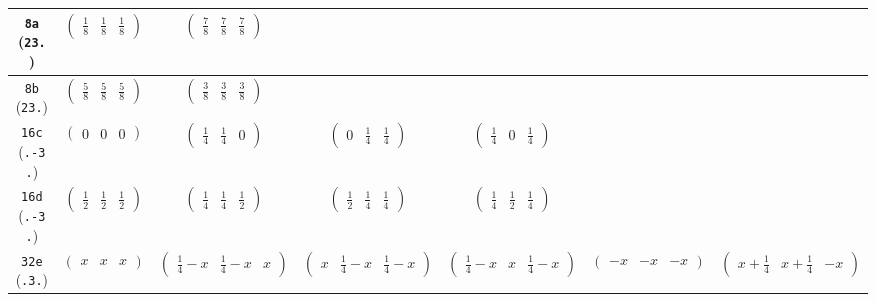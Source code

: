 \documentclass[fleqn,9pt,landscape]{jsarticle}
\begin{document}
\begin{center}
\begin{longtable}{ccccccc}
{\tt 8a} ({\tt 23.}) & $ \begin{pmatrix} \frac{1}{8} & \frac{1}{8} & \frac{1}{8} \end{pmatrix} $ & $ \begin{pmatrix} \frac{7}{8} & \frac{7}{8} & \frac{7}{8} \end{pmatrix} $ & $  $ & $  $ & $  $ & $  $ \\ \hline
{\tt 8b} ({\tt 23.}) & $ \begin{pmatrix} \frac{5}{8} & \frac{5}{8} & \frac{5}{8} \end{pmatrix} $ & $ \begin{pmatrix} \frac{3}{8} & \frac{3}{8} & \frac{3}{8} \end{pmatrix} $ & $  $ & $  $ & $  $ & $  $ \\ \hline
{\tt 16c} ({\tt .-3.}) & $ \begin{pmatrix} 0 & 0 & 0 \end{pmatrix} $ & $ \begin{pmatrix} \frac{1}{4} & \frac{1}{4} & 0 \end{pmatrix} $ & $ \begin{pmatrix} 0 & \frac{1}{4} & \frac{1}{4} \end{pmatrix} $ & $ \begin{pmatrix} \frac{1}{4} & 0 & \frac{1}{4} \end{pmatrix} $ & $  $ & $  $ \\ \hline
{\tt 16d} ({\tt .-3.}) & $ \begin{pmatrix} \frac{1}{2} & \frac{1}{2} & \frac{1}{2} \end{pmatrix} $ & $ \begin{pmatrix} \frac{1}{4} & \frac{1}{4} & \frac{1}{2} \end{pmatrix} $ & $ \begin{pmatrix} \frac{1}{2} & \frac{1}{4} & \frac{1}{4} \end{pmatrix} $ & $ \begin{pmatrix} \frac{1}{4} & \frac{1}{2} & \frac{1}{4} \end{pmatrix} $ & $  $ & $  $ \\ \hline
{\tt 32e} ({\tt .3.}) & $ \begin{pmatrix} x & x & x \end{pmatrix} $ & $ \begin{pmatrix} \frac{1}{4} - x & \frac{1}{4} - x & x \end{pmatrix} $ & $ \begin{pmatrix} x & \frac{1}{4} - x & \frac{1}{4} - x \end{pmatrix} $ & $ \begin{pmatrix} \frac{1}{4} - x & x & \frac{1}{4} - x \end{pmatrix} $ & $ \begin{pmatrix} - x & - x & - x \end{pmatrix} $ & $ \begin{pmatrix} x + \frac{1}{4} & x + \frac{1}{4} & - x \end{pmatrix} $ \\

\end{longtable}
\end{center}
\end{document}

